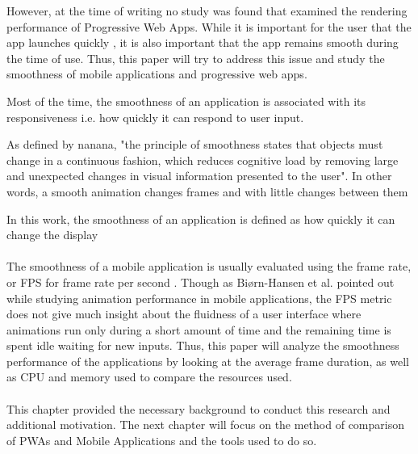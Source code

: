 \documentclass{kththesis}
\begin{document}
However, at the time of writing no study was found that examined the rendering performance of Progressive Web Apps. While it is important for the user that the app launches quickly \cite{launch_time}, it is also important that the app remains smooth during the time of use. \newline
Thus, this paper will try to address this issue and study the smoothness of mobile applications and progressive web apps.

Most of the time, the smoothness of an application is associated with its responsiveness i.e. how quickly it can respond to user input.

As defined by nanana, "the principle of smoothness states that objects must change in a continuous fashion, which reduces cognitive load by removing large and unexpected changes in visual information presented to the user". In other words, a smooth animation changes frames and with little changes between them 

In this work, the smoothness of an application is defined as how quickly it can change the display

\paragraph{}
The smoothness of a mobile application is usually evaluated using the frame rate, or FPS for frame rate per second \cite{smoothnessQoE} . Though as Biørn-Hansen et al. pointed out while studying animation performance in mobile applications, the FPS metric does not give much insight about the fluidness of a user interface where animations run only during a short amount of time and the remaining time is spent idle waiting for new inputs.
\newline
Thus, this paper will analyze the smoothness performance of the applications by looking at the average frame duration, as well as CPU and memory used to compare the resources used. 





\paragraph{}
This chapter provided the necessary background to conduct this research and additional motivation. The next chapter will focus on the method of comparison of PWAs and Mobile Applications and the tools used to do so.
    
\end{document}
